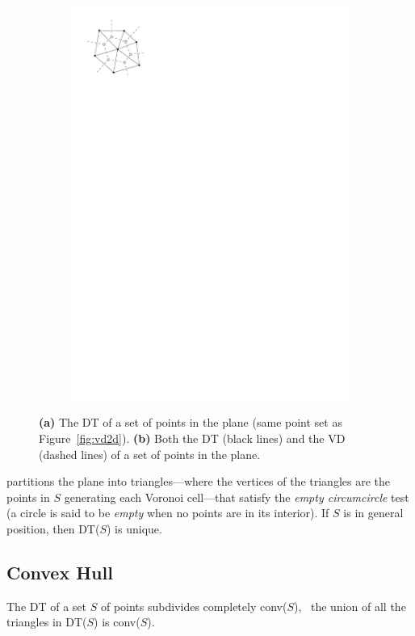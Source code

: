 \begin{figure}
\begin{subfigure}[b]{0.3\linewidth}
    \includegraphics[width=\textwidth]{figs/duality_2d}
    \caption{}\label{fig:dt2db}
  \end{subfigure}%
  \caption{\textbf{(a)} The DT of a set of points in the plane (same point set as Figure~\ref{fig:vd2d}). \textbf{(b)} Both the DT (black lines) and the VD (dashed lines) of a set of points in the plane.}
\label{fig:dt2d}
\end{figure}
partitions the plane into triangles---where the vertices of the triangles are the points in $S$ generating each Voronoi cell---that satisfy the \emph{empty circumcircle} test (a circle is said to be \emph{empty} when no points are in its interior). 
If $S$ is in general position, then DT($S$) is unique.

%
\subsection{Convex Hull}
The DT of a set $S$ of points subdivides completely conv($S$), \ie\ the union of all the triangles in DT($S$) is conv($S$).


